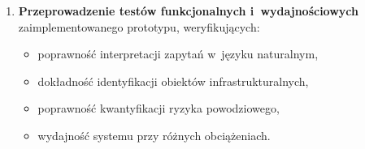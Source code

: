\begin{enumerate}
    \item \textbf{Przeprowadzenie testów funkcjonalnych i~wydajnościowych} zaimplementowanego prototypu, weryfikujących:
    \begin{itemize}
        \item poprawność interpretacji zapytań w~języku naturalnym,
        \item dokładność identyfikacji obiektów infrastrukturalnych,
        \item poprawność kwantyfikacji ryzyka powodziowego,
        \item wydajność systemu przy różnych obciążeniach.
    \end{itemize}
\end{enumerate}
